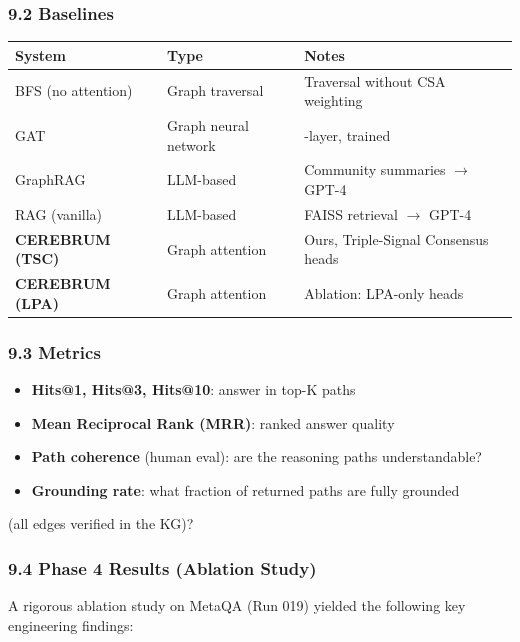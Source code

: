 \documentclass[10pt,journal,compsoc]{IEEEtran}
\begin{document}
\subsubsection{9.2 Baselines}

\begin{center}
{\footnotesize
\begin{tabularx}{\columnwidth}{|>{\raggedright\arraybackslash}X|>{\raggedright\arraybackslash}X|>{\raggedright\arraybackslash}X|}
\hline
System & Type & Notes \\ \hline
BFS (no attention) & Graph traversal & Traversal without CSA weighting \\ \hline
GAT & Graph neural network & 2-layer, trained \\ \hline
GraphRAG & LLM-based & Community summaries $\to$ GPT-4 \\ \hline
RAG (vanilla) & LLM-based & FAISS retrieval $\to$ GPT-4 \\ \hline
\textbf{CEREBRUM (TSC)} & Graph attention & Ours, Triple-Signal Consensus heads \\ \hline
\textbf{CEREBRUM (LPA)} & Graph attention & Ablation: LPA-only heads \\ \hline
\end{tabularx}
}
\end{center}

\subsubsection{9.3 Metrics}

\begin{itemize}
\item \textbf{Hits@1, Hits@3, Hits@10}: answer in top-K paths
\item \textbf{Mean Reciprocal Rank (MRR)}: ranked answer quality
\item \textbf{Path coherence} (human eval): are the reasoning paths under\-standable?
\item \textbf{Grounding rate}: what fraction of returned paths are fully grounded
\end{itemize}
  (all edges verified in the KG)?

\subsubsection{9.4 Phase 4 Results (Ablation Study)}

A rigorous ablation study on MetaQA (Run 019) yielded the following key engineering findings:
\end{document}
